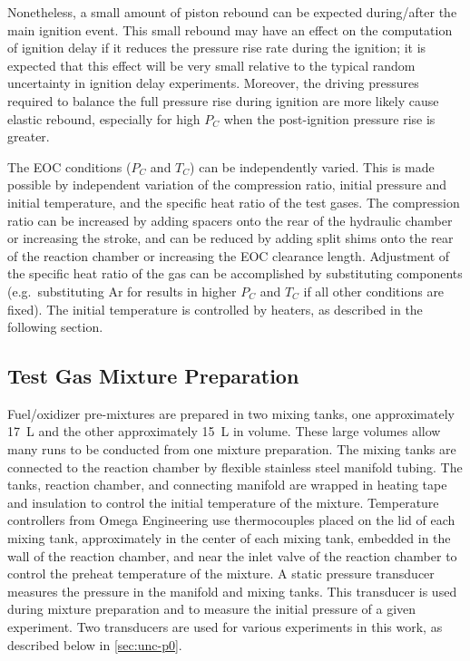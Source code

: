 \documentclass[../main.tex]{subfiles}
\begin{document}
Nonetheless,
a small amount of piston rebound can be expected during/after the
main ignition event. This small rebound may have an effect on the computation of
ignition delay if it reduces the pressure rise rate during the ignition;
it is expected that this effect will be very small relative to the
typical random uncertainty in ignition delay experiments. Moreover,
the driving pressures required to balance the full pressure rise during
ignition are more likely cause elastic rebound,
especially for high $P_C$ when the post-ignition pressure rise is greater.

The EOC conditions ($P_C$ and $T_C$) can be independently varied. This
is made possible by independent variation of the compression ratio,
initial pressure and initial temperature, and the specific heat ratio
of the test gases. The compression ratio can be
increased by adding spacers onto the rear of the hydraulic chamber or
increasing the stroke, and can be reduced by adding split shims onto
the rear of the reaction chamber or increasing the EOC clearance length.
Adjustment of the specific heat ratio of the gas can be accomplished
by substituting components (e.g.\ substituting Ar for  results in
higher $P_C$ and $T_C$ if all other conditions are fixed). The initial
temperature is controlled by heaters, as described in the following
section.

\subsection{Test Gas Mixture Preparation}

Fuel/oxidizer pre-mixtures are prepared in two mixing tanks, one approximately
\SI{17}{\liter} and the other approximately \SI{15}{\liter} in volume. These large volumes allow many
runs to be conducted from one mixture preparation. The mixing tanks are connected
to the reaction chamber by flexible stainless steel manifold tubing. The tanks, reaction chamber,
and connecting manifold are wrapped in heating tape and insulation to control the initial
temperature of the mixture. Temperature controllers from Omega Engineering use thermocouples
placed on the lid of each mixing tank, approximately in the center of each mixing tank, embedded in
the wall of the reaction chamber, and near the inlet valve of the reaction chamber to control the
preheat temperature of the mixture. A static pressure transducer
measures the pressure in the manifold and mixing tanks. This transducer is used
during mixture preparation and to measure the initial pressure of a given experiment.
Two transducers are used for various experiments in this work, as described below
in \cref{sec:unc-p0}.
\end{document}
